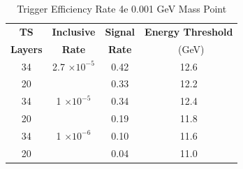 \begin{table}
 \centering
\caption{Trigger Efficiency Rate 4e 0.001 GeV Mass Point}
\begin{tabular}{ c | c | c | c }
\textbf{TS} & \textbf{Inclusive} & \textbf{Signal} & \textbf{Energy Threshold}  \\ \textbf{Layers} & \textbf{Rate} & \textbf{Rate} & \ (GeV) \\ 
\hline
34 & 2.7 $\times 10^{-5}$ & 0.42 & 12.6 \\ 
20 & & 0.33 & 12.2 \\ 
\hline 
34 & 1 $\times 10^{-5}$ & 0.34 & 12.4 \\ 
20 & & 0.19 & 11.8 \\ 
\hline 
34 & 1 $\times 10^{-6}$ & 0.10 & 11.6 \\ 
20 & & 0.04 & 11.0 \\ 
\hline 
\end{tabular}
\end{table}
